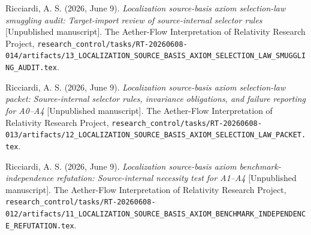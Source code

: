 \documentclass[11pt]{article}
\begin{document}
Ricciardi, A. S. (2026, June 9). \emph{Localization source-basis axiom
selection-law smuggling audit: Target-import review of source-internal
selector rules} [Unpublished manuscript]. The Aether-Flow Interpretation of
Relativity Research Project,
\texttt{research\_control/tasks/RT-20260608-014/artifacts/13\_LOCALIZATION\_SOURCE\_BASIS\_AXIOM\_SELECTION\_LAW\_SMUGGLING\_AUDIT.tex}.

Ricciardi, A. S. (2026, June 9). \emph{Localization source-basis axiom
selection-law packet: Source-internal selector rules, invariance obligations,
and failure reporting for A0--A4} [Unpublished manuscript]. The Aether-Flow
Interpretation of Relativity Research Project,
\texttt{research\_control/tasks/RT-20260608-013/artifacts/12\_LOCALIZATION\_SOURCE\_BASIS\_AXIOM\_SELECTION\_LAW\_PACKET.tex}.

Ricciardi, A. S. (2026, June 9). \emph{Localization source-basis axiom
benchmark-independence refutation: Source-internal necessity test for A1--A4}
[Unpublished manuscript]. The Aether-Flow Interpretation of Relativity
Research Project,
\texttt{research\_control/tasks/RT-20260608-012/artifacts/11\_LOCALIZATION\_SOURCE\_BASIS\_AXIOM\_BENCHMARK\_INDEPENDENCE\_REFUTATION.tex}.
\end{document}

